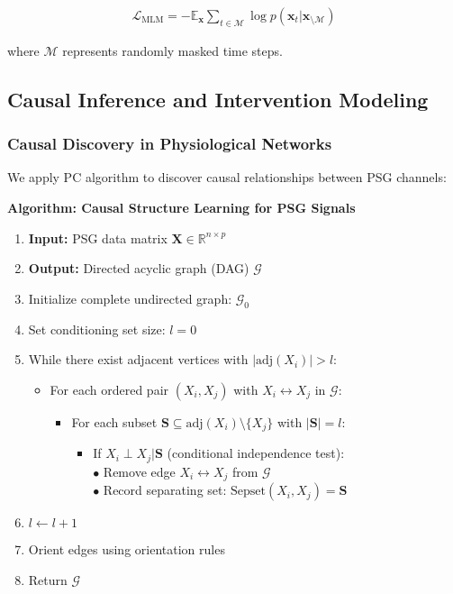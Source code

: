 \documentclass[11pt]{article}
\begin{document}
\begin{align}
\mathcal{L}_{\text{MLM}} = -\mathbb{E}_{\mathbf{x}} \sum_{t \in \mathcal{M}} \log p(\mathbf{x}_t | \mathbf{x}_{\setminus \mathcal{M}})
\end{align}

where $\mathcal{M}$ represents randomly masked time steps.

\subsection{Causal Inference and Intervention Modeling}

\subsubsection{Causal Discovery in Physiological Networks}
We apply PC algorithm to discover causal relationships between PSG channels:

\textbf{Algorithm: Causal Structure Learning for PSG Signals}

\begin{enumerate}
\item \textbf{Input:} PSG data matrix $\mathbf{X} \in \mathbb{R}^{n \times p}$
\item \textbf{Output:} Directed acyclic graph (DAG) $\mathcal{G}$
\item Initialize complete undirected graph: $\mathcal{G}_0$
\item Set conditioning set size: $l = 0$
\item While there exist adjacent vertices with $|\text{adj}(X_i)| > l$:
    \begin{itemize}
    \item For each ordered pair $(X_i, X_j)$ with $X_i \leftrightarrow X_j$ in $\mathcal{G}$:
        \begin{itemize}
        \item For each subset $\mathbf{S} \subseteq \text{adj}(X_i) \setminus \{X_j\}$ with $|\mathbf{S}| = l$:
            \begin{itemize}
            \item If $X_i \perp X_j | \mathbf{S}$ (conditional independence test): \\
                \quad $\bullet$ Remove edge $X_i \leftrightarrow X_j$ from $\mathcal{G}$ \\
                \quad $\bullet$ Record separating set: $\text{Sepset}(X_i, X_j) = \mathbf{S}$
            \end{itemize}
        \end{itemize}
    \end{itemize}
    \item $l \leftarrow l + 1$
\item Orient edges using orientation rules
\item Return $\mathcal{G}$
\end{enumerate}
\end{document}

